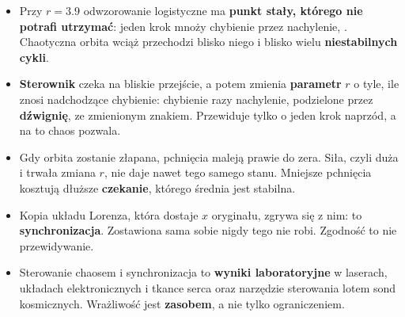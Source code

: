 \begin{summarybox}
\begin{itemize}
\item Przy $r = \num{3.9}$ odwzorowanie logistyczne ma \textbf{punkt stały,
  którego nie potrafi utrzymać}: jeden krok mnoży chybienie przez
  nachylenie, . Chaotyczna orbita wciąż przechodzi blisko
  niego i blisko wielu \textbf{niestabilnych cykli}.
\item \textbf{Sterownik} czeka na bliskie przejście, a potem zmienia
  \textbf{parametr} $r$ o tyle, ile znosi nadchodzące chybienie: chybienie
  razy nachylenie, podzielone przez \textbf{dźwignię}, ze zmienionym znakiem.
  Przewiduje tylko o jeden krok naprzód, a na to chaos pozwala.
\item Gdy orbita zostanie złapana, pchnięcia maleją prawie do zera. Siła,
  czyli duża i trwała zmiana $r$, nie daje nawet tego samego stanu. Mniejsze
  pchnięcia kosztują dłuższe \textbf{czekanie}, którego średnia jest stabilna.
\item Kopia układu Lorenza, która dostaje $x$ oryginału, zgrywa się z nim:
  to \textbf{synchronizacja}. Zostawiona sama sobie nigdy tego nie robi.
  Zgodność to nie przewidywanie.
\item Sterowanie chaosem i synchronizacja to \textbf{wyniki laboratoryjne}
  \dash{} w laserach, układach elektronicznych i tkance serca \dash{} oraz
  narzędzie sterowania lotem sond kosmicznych. Wrażliwość jest
  \textbf{zasobem}, a nie tylko ograniczeniem.
\end{itemize}
\end{summarybox}

\canyou


